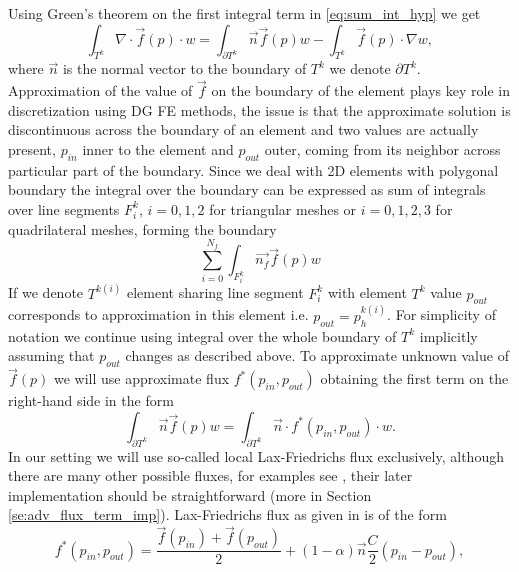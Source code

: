 Using Green's theorem on the first integral term in \eqref{eq:sum_int_hyp} we 
get
\begin{equation}
    \label{eq:hyp_term}
    \int_{T^k} \nabla\cdot \vec{f}(p)\cdot w = %
    \int_{\partial{T^k}} \vec{n}\vec{f}(p)w - \int_{T^k} \vec{f}(p)\cdot\nabla w,
\end{equation}
where $\vec{n}$ is the normal vector to the boundary of $T^k$ we denote 
$\partial T^k$. Approximation of the value of $\vec{f}$ on the boundary of the 
element plays key role in discretization using DG FE methods, the issue is 
that the approximate solution is discontinuous across the boundary of an 
element and two values are actually present, $p_{in}$ inner to the element and 
$p_{out}$ outer, coming from its neighbor across particular part of the 
boundary. Since we deal with 2D 
elements with polygonal boundary the integral over the boundary can be expressed as sum 
of integrals over line segments ${F^k_i}$, $i=0,1,2$ for triangular meshes or 
$i=0,1,2,3$ for quadrilateral meshes, forming the boundary
\begin{equation}
    \sum_{i=0}^{N_f} \int_{F^k_i} \vec{n_f}\vec{f}(p)w
\end{equation}
If we denote $T^{k(i)}$ element sharing line segment $F^k_i$ with element $T^k$
value $p_{out}$ corresponds to approximation in this element i.e. $p_{out} = 
p^{k(i)}_h$. For simplicity of notation we continue using integral over the whole 
boundary of $T^k$ implicitly assuming that $p_{out}$ changes as described above. To 
approximate unknown value of $\vec{f}(p)$  we will use approximate flux $f^*(p_{in}, 
p_{out})$ obtaining the first term on the right-hand side in the form
\begin{equation}
    \label{eq:flux_integral}
    \int_{\partial{T^k}} \vec{n}\vec{f}(p)w = \int_{\partial{T^k}} \vec{n} 
    \cdot f^{*} (p_{in}, p_{out})\cdot w.
\end{equation}
In our setting we will use so-called local Lax-Friedrichs flux 
exclusively, although there are many other possible fluxes, for examples see 
\cite{Kucera, Cockburn2001a}, their later implementation should be straightforward (more 
in Section \ref{se:adv_flux_term_imp}). Lax-Friedrichs flux as given in 
\cite{Hesthaven2008} 
is of the form
\begin{equation}
    \label{eq:lax-frieflux}
    f^{*}(p_{in}, p_{out}) =   \frac{\vec{f}(p_{in}) + \vec{f}(p_{out})}{2}  + (1-\alpha) \vec{n}\frac{C}{2}(p_{in} - 
    p_{out}),
\end{equation}
